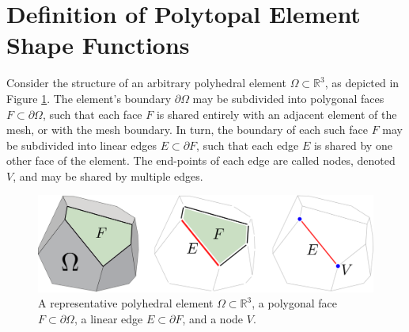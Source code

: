 \section{Definition of Polytopal Element Shape Functions}

	Consider the structure of an arbitrary polyhedral element $\Omega \subset \mathbb{R}^3$, as depicted in Figure \ref{fig:polyhedral_element}. The element's boundary $\partial \Omega$ may be subdivided into polygonal faces $F \subset \partial \Omega$, such that each face $F$ is shared entirely with an adjacent element of the mesh, or with the mesh boundary. In turn, the boundary of each such face $F$ may be subdivided into linear edges $E \subset \partial F$, such that each edge $E$ is shared by one other face of the element. The end-points of each edge are called nodes, denoted $V$, and may be shared by multiple edges.
	
\begin{figure} [!ht]
	\centering
	\includegraphics[width = 6.0in]{figures/polyhedron_decomposition.pdf}
	\caption{A representative polyhedral element $\Omega \subset \mathbb{R}^3$, a polygonal face $F \subset \partial \Omega$, a linear edge $E \subset \partial F$, and a node $V$.}
	\label{fig:polyhedral_element}
\end{figure}
	
